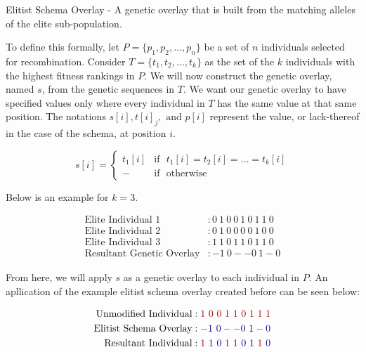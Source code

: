 \begin{overlay}
Elitist Schema Overlay - A genetic overlay that is built from the matching alleles of the elite sub-population.
\end{overlay}

To define this formally, let $P = \{p_1,p_2,\ldots,p_n\}$ be a set of $n$ individuals selected for recombination. Consider $T=\{t_1,t_2,\ldots,t_k\}$ as the set of the $k$ individuals with the highest fitness rankings in $P$. We will now construct the genetic overlay, named $s$, from the genetic sequences in $T$. We want our genetic overlay to  have specified values only where every individual in $T$ has the same value at that same position. The notations $s[i], t[i]_j, \text{ and } p[i]$ represent the value, or lack-thereof in the case of the schema, at position $i$. 
 
 \begin{displaymath}
   s[i] = \left\{
     \begin{array}{cl}
       t_1[i] & \text{if~ } t_1[i] = t_2[i] = \ldots = t_k[i] \\
       - & \text{if~ } \text{otherwise} 
     \end{array}
   \right.
\end{displaymath} 

\noindent Below is an example for $k = 3$.

\begin{align*}
\text{Elite Individual 1} &: 0~1~0~0~1~0~1~1~0 			\\
\text{Elite Individual 2} &: 0~1~0~0~0~0~1~0~0 			\\
\text{Elite Individual 3} &: 1~1~0~1~1~0~1~1~0 			\\  
\text{Resultant Genetic Overlay} &:   -1~0--0~1-0			
\end{align*}

From here, we will apply $s$ as a genetic overlay to each individual in $P$. An apllication of the example elitist schema overlay created before can be seen below:

\begin{align*}
\text{Unmodified Individual} &: {\color{myred}1~0~0~1~1~0~1~1~1}		\\	
\text{Elitist Schema Overlay} &:   {\color{myblue}-1~0--0~1-0	}		\\  	
\text{Resultant Individual} &:  {\color{myred}1}~{\color{myblue}1~0}~ {\color{myred}1~1}~{\color{myblue}0~1}~ {\color{myred}1}~{\color{myblue}0}
\end{align*}


